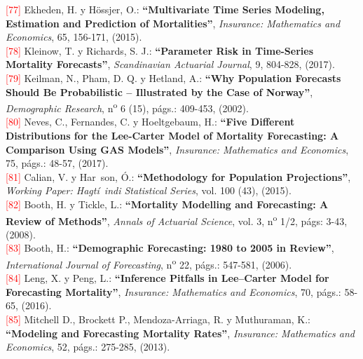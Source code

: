 \noindent \textcolor{red}{[77]}  Ekheden, H. y H\"ossjer, O.: \textbf{``Multivariate Time Series Modeling, Estimation and Prediction of Mortalities''}, \textit{Insurance: Mathematics and Economics}, 65, 156-171, (2015).\\

\noindent \textcolor{red}{[78]} Kleinow, T. y Richards, S. J.: \textbf{``Parameter Risk in Time-Series Mortality Forecasts''}, \textit{Scandinavian Actuarial Journal}, 9, 804-828, (2017).\\

\noindent \textcolor{red}{[79]} Keilman, N., Pham, D. Q. y Hetland, A.: \textbf{``Why Population Forecasts Should Be Probabilistic -- Illustrated by the Case of Norway''}, \textit{Demographic Research}, n\textsuperscript{o} 6 (15), págs.: 409-453, (2002).\\

\noindent \textcolor{red}{[80]} Neves, C., Fernandes, C. y Hoeltgebaum, H.: \textbf{``Five Different Distributions for the Lee-Carter Model of Mortality Forecasting: A Comparison Using GAS Models''}, \textit{Insurance: Mathematics and Economics}, 75, págs.: 48-57, (2017).\\

\noindent \textcolor{red}{[81]} Calian, V. y Har\dh\ \hspace{-0.11cm}son, \'O.: \textbf{``Methodology for Population Projections''}, \textit{Working Paper: Hagt\'i\dh\ \hspace{-0.1cm}indi Statistical Series}, vol. 100 (43), (2015).\\

\noindent \textcolor{red}{[82]} Booth, H. y Tickle, L.: \textbf{``Mortality Modelling and Forecasting: A Review of Methods''}, \textit{Annals of Actuarial Science}, vol. 3, n\textsuperscript{o} 1/2, p\'ags: 3-43, (2008).\\ 

\noindent \textcolor{red}{[83]} Booth, H.: \textbf{``Demographic Forecasting: 1980 to 2005 in Review''}, \textit{International Journal of Forecasting},  n\textsuperscript{o} 22, págs.: 547-581, (2006).\\

\noindent \textcolor{red}{[84]} Leng, X. y Peng, L.: \textbf{``Inference Pitfalls in Lee–Carter Model for Forecasting Mortality''}, \textit{Insurance: Mathematics and Economics}, 70, págs.: 58-65, (2016).\\

\noindent \textcolor{red}{[85]} Mitchell D., Brockett P., Mendoza-Arriaga, R. y Muthuraman, K.: \textbf{``Modeling and Forecasting Mortality Rates''}, \textit{Insurance: Mathematics and Economics}, 52, págs.: 275-285, (2013).\\

